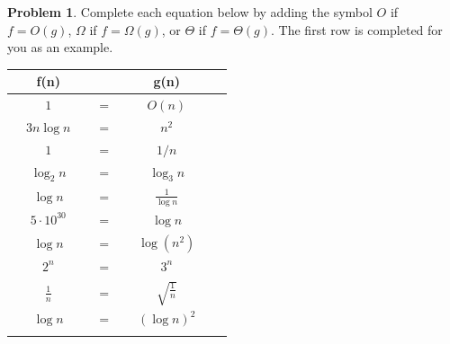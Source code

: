 \documentclass[10pt]{article}
\theoremstyle{definition}
\newtheorem{problem}{Problem}
\begin{document}
\newpage
\begin{problem}
    Complete each equation below by adding the symbol $O$ if $f=O(g)$, $\Omega$ if $f=\Omega(g)$, or $\Theta$ if $f=\Theta(g)$.  
    The first row is completed for you as an example.

{\renewcommand{\arraystretch}{4.4}
\begin{tabular}{c c c c c c}
    & f(n) &~\hspace{0.5in}~$ $~\hspace{0.5in}~& g(n) &\\
    \hline
    & $1$ & ~\hspace{0.5in}~$=$~\hspace{0.5in}~  & $O(n)$ &  &\\
    \arrayrulecolor{gray}\hline
    & $3 n\log n$ & ~\hspace{0.5in}~$=$~\hspace{0.5in}~  & $n^2$ &  &\\
    \arrayrulecolor{gray}\hline
    & $1$ & ~\hspace{0.5in}~$=$~\hspace{0.5in}~  & $1/n$ &  &\\
    \arrayrulecolor{gray}\hline
    & $\log_2 n$ & ~\hspace{0.5in}~$=$~\hspace{0.5in}~  & $\log_3 n$ &  &\\
    \arrayrulecolor{gray}\hline
    & $\log n$ & ~\hspace{0.5in}~$=$~\hspace{0.5in}~  & $\frac {1} {\log n}$ &  &\\
    \arrayrulecolor{gray}\hline
    & $5\cdot10^{30}$ & ~\hspace{0.5in}~$=$~\hspace{0.5in}~  & $\log n$ &  &\\
    \arrayrulecolor{gray}\hline
    & $\log n$ & ~\hspace{0.5in}~$=$~\hspace{0.5in}~  & $\log (n^2)$ &  &\\
    \arrayrulecolor{gray}\hline
    & $2^n$ & ~\hspace{0.5in}~$=$~\hspace{0.5in}~  & $3^n$ &  &\\
    \arrayrulecolor{gray}\hline
    & $\frac 1 n$ & ~\hspace{0.5in}~$=$~\hspace{0.5in}~  & $\sqrt{\frac 1 n}$ &  &\\
    \arrayrulecolor{gray}\hline
    & $\log n$ & ~\hspace{0.5in}~$=$~\hspace{0.5in}~  & $(\log n)^2$ &  &\\
    \arrayrulecolor{gray}\hline


\end{tabular}}
\end{problem}
\end{document}
